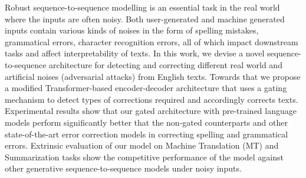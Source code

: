 Robust sequence-to-sequence modelling is an essential task in the real world where the inputs are often noisy. Both user-generated and machine generated inputs contain various kinds of noises in the form of spelling mistakes, grammatical errors, character recognition errors, all of which impact downstream tasks and affect interpretability of texts. In this work, we devise a novel sequence-to-sequence architecture for detecting and correcting different real world and artificial noises (adversarial attacks) from English texts. Towards that we propose a modified Transformer-based  encoder-decoder architecture that uses a gating mechanism to detect types of corrections required and accordingly corrects texts. Experimental results show that our gated architecture with pre-trained language models perform significantly better that the non-gated counterparts and other state-of-the-art error correction models in correcting spelling and grammatical errors. Extrinsic evaluation of our model on Machine Translation (MT) and Summarization tasks show the competitive performance of the model against other generative sequence-to-sequence models under noisy inputs.
